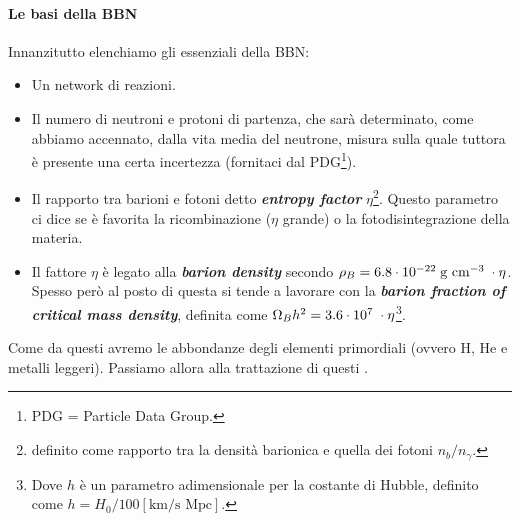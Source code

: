 
\paragraph{Le basi della BBN} Innanzitutto elenchiamo gli  essenziali della BBN:
\begin{itemize}
    \item Un network di reazioni.
    \item Il numero di neutroni e protoni di partenza, che sarà determinato, come abbiamo accennato, dalla vita media del neutrone, misura sulla quale tuttora è presente una certa incertezza (fornitaci dal PDG\footnote{PDG = Particle Data Group.}).
    \item Il rapporto tra barioni e fotoni detto \textbf{\textit{entropy factor}} $\eta$\footnote{ definito come rapporto tra la densità barionica e quella dei fotoni $n_b/n_\gamma$.}. Questo parametro ci dice se è favorita la ricombinazione ($\eta$ grande) o la fotodisintegrazione della materia.
    \item Il fattore $\eta$ è legato alla \textbf{\textit{barion density}} secondo $\rho_B = 6.8\cdot10^{-22}\;\mbox{g cm}^{-3}\; \cdot \eta$. Spesso però al posto di questa si tende a lavorare con la \textbf{\textit{barion fraction of critical mass density}}, definita come $\Omega_B h^2= 3.6 \cdot10^{7}\;\cdot \eta$\footnote{Dove $h$ è un parametro adimensionale per la costante di Hubble, definito come $h=H_0/100 [\mbox{km}/\mbox{s Mpc}]$.}.
\end{itemize}
Come  da questi avremo le abbondanze degli elementi primordiali (ovvero H, He e metalli leggeri). Passiamo allora alla trattazione di questi .


